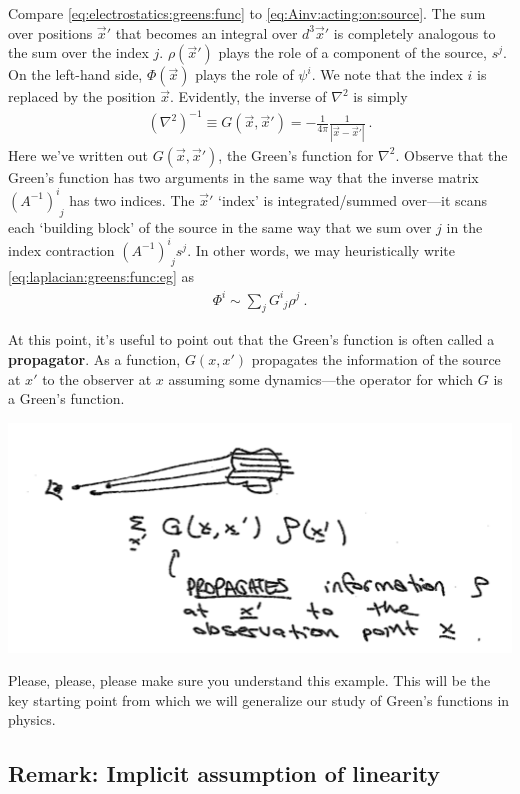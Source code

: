 Compare \eqref{eq:electrostatics:greens:func} to \eqref{eq:Ainv:acting:on:source}. The sum over positions $\vec{x}'$ that becomes an integral over $d^3\vec{x}'$ is completely analogous to the sum over the index $j$. $\rho(\vec{x}')$ plays the role of a component of the source, $s^j$. On the left-hand side, $\Phi(\vec{x})$ plays the role of $\psi^i$. We note that the index $i$ is replaced by the position $\vec{x}$. Evidently, the inverse of $\nabla^2$ is simply
\begin{align}
  (\nabla^2)^{-1} \equiv G(\vec{x},\vec{x}') = -\frac{1}{4\pi} \frac{1}{|\vec{x}-\vec{x}'|} \ .
  \label{eq:laplacian:greens:func:eg}
\end{align}
Here we've written out $G(\vec{x},\vec{x}')$, the Green's function for $\nabla^2$. Observe that the Green's function has two arguments in the same way that the inverse matrix $\left(A^{-1}\right)^i_{\phantom{i}j}$ has two indices. The $\vec{x}'$ `index' is integrated/summed over---it scans each `building block' of the source in the same way that we sum over $j$ in the index contraction $\left(A^{-1}\right)^i_{\phantom{i}j}s^j$. In other words, we may heuristically write \eqref{eq:laplacian:greens:func:eg} as
\begin{align}
  \Phi^i \sim \sum_j G^i_{\phantom{i}j}\rho^j \ .
\end{align}

At this point, it's useful to point out that the Green's function is often called a \textbf{propagator}. As a function, $G(x,x')$ propagates the information of the source at $x'$ to the observer at $x$ assuming some dynamics---the operator for which $G$ is a Green's function.
\begin{center}
\includegraphics[width=.5\textwidth]{figures/lec06_propagator.png}
\end{center}

Please, please, please make sure you understand this example. This will be the key starting point from which we will generalize our study of Green's functions in physics.

\subsection{Remark: Implicit assumption of linearity}

